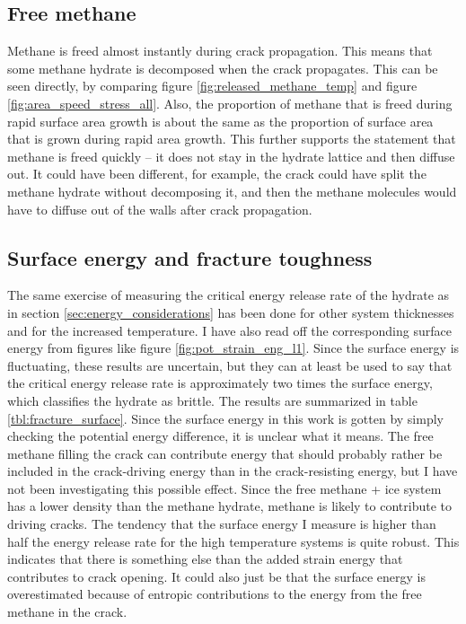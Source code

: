 \subsection{Free methane}
Methane is freed almost instantly during crack propagation. This means that some methane hydrate is decomposed when the crack propagates. This can be seen directly, by comparing figure \ref{fig:released_methane_temp} and figure \ref{fig:area_speed_stress_all}. Also, the proportion of methane that is freed during rapid surface area growth is about the same as the proportion of surface area that is grown during rapid area growth. This further supports the statement that methane is freed quickly -- it does not stay in the hydrate lattice and then diffuse out.
It could have been different, for example, the crack could have split the methane hydrate without decomposing it, and then the methane molecules would have to diffuse out of the walls after crack propagation. 

\subsection{Surface energy and fracture toughness}
The same exercise of measuring the critical energy release rate of the hydrate as in section \ref{sec:energy_considerations} has been done for other system thicknesses and for the increased temperature. I have also read off the corresponding surface energy from figures like figure \ref{fig:pot_strain_eng_l1}. Since the surface energy is fluctuating, these results are uncertain, but they can at least be used to say that the critical energy release rate is approximately two times the surface energy, which classifies the hydrate as brittle. The results are summarized in table \ref{tbl:fracture_surface}. Since the surface energy in this work is gotten by simply checking the potential energy difference, it is unclear what it means. The free methane filling the crack can contribute energy that should probably rather be included in the crack-driving energy than in the crack-resisting energy, but I have not been investigating this possible effect. Since the free methane + ice system has a lower density than the methane hydrate, methane is likely to contribute to driving cracks. 
The tendency that the surface energy I measure is higher than half the energy release rate for the high temperature systems is quite robust. This indicates that there is something else than the added strain energy that contributes to crack opening. It could also just be that the surface energy is overestimated because of entropic contributions to the energy from the free methane in the crack.


